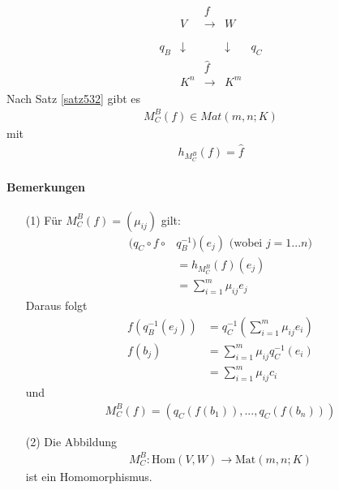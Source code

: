 \documentclass[11pt]{report}
\begin{document}
\begin{align} 
\begin{matrix}
\phantom{m} & & f & & \\
 & V & \longrightarrow & W & \\
 & & \phantom{m} & & \\
q_{B} & \downarrow & & \downarrow & q_{C} \\
 & & \hat{f} & & \\
& K^{n} & \longrightarrow & K^{m} &
\end{matrix}
\end{align}
Nach Satz \ref{satz532} gibt es
\begin{align}
M_{C}^{B}(f) \in Mat(m,n;K)
\end{align}
mit
\begin{align}
h_{M_{C}^{B}}(f) = \hat{f}
\end{align}

\paragraph{Bemerkungen}
\begin{itemize}
 \item[(1)] Für $M_{C}^{B}(f) = (\mu_{ij})$ gilt:
\begin{align}
 (q_C \circ f \circ &q_B^{-1})(e_j) \text{ (wobei } j=1...n) \\
&= h_{M_{C}^{B}}(f) (e_j) \\
&= \sum_{i=1}^{m} \mu_{ij} e_j
\end{align}
Daraus folgt
\begin{align}
f(q_B^{-1}(e_j)) &= q_C^{-1} \left( \sum_{i=1}^{m} \mu_{ij} e_i\right) \\
f(b_j) &= \sum_{i=1}^{m} \mu_{ij} q_C^{-1}(e_i) \\
&= \sum_{i=1}^{m} \mu_{ij} c_i
\end{align}
und
\begin{align}
M_{C}^{B} (f) = (q_C(f(b_1)), ..., q_C(f(b_n)))
\end{align}
 \item[(2)] Die Abbildung
\begin{align}
M_{C}^{B}: \text{Hom}(V,W) \rightarrow \text{Mat}(m,n;K)
\end{align}
ist ein Homomorphismus.
\end{itemize}

\end{document}
